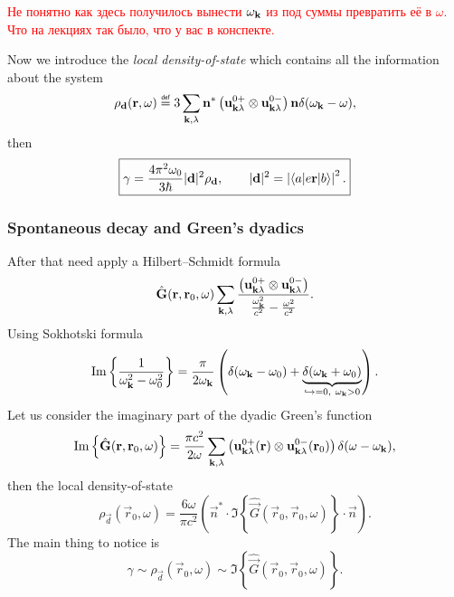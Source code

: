 \begin{otherlanguage}{russian}	
	\textcolor{red}{Не понятно как здесь получилось вынести $\omega_{\mathbf{k}}$ из под суммы превратить её в $\omega$. Что на лекциях так было, что у вас в конспекте.}
\end{otherlanguage}
Now we introduce the \textit{local density-of-state} which contains all the information about the system
\begin{equation}
	\rho_{\vec{d}} (\vec{r}, \omega) \myeq 3 \sum_{\kv, \lambda} \vec{n}^* \left( \vec{u}^{0+}_{\kv \lambda} \otimes \vec{u}^{0-}_{\kv \lambda} \right) \vec{n} \delta (\omega_{\kv} - \omega),
\end{equation}
then
\begin{equation}
	\boxed{	\gamma  = \frac{4 \pi^2 \omega_0}{3 \hbar} |\mathbf{d}|^2 \rho_{\mathbf{d}}, \qquad |\mathbf{d}|^2 = \left|  \langle a\rvert e \mathbf{r} \lvert b\rangle \right|^2. }
	\label{eq:gamma_start}
\end{equation}

\subsubsection{Spontaneous decay and Green's dyadics}

After that need apply a Hilbert–Schmidt formula 
\begin{equation}
	\hat{\mathbf{G}} (\mathbf{r}, \mathbf{r}_0, \omega) \sum_{\mathbf{k}, \lambda} \frac{\left( \mathbf{u}^{0+}_{\mathbf{k} \lambda} \otimes \mathbf{u}^{0-}_{\mathbf{k} \lambda} \right)}{\frac{\omega_{\mathbf{k}}^2}{c^2} - \frac{\omega^2}{c^2}}.
\end{equation}
Using Sokhotski formula
\begin{equation}
	\operatorname{Im} \left\{ \frac{1}{\omega_{\mathbf{k}}^2 - \omega_{0}^2} \right\} = \frac{\pi}{2 \omega_{\mathbf{k}}} \left( \delta(\omega_{\mathbf{k}} - \omega_{0}) + \underbrace{\delta(\omega_{\mathbf{k}} + \omega_{0})}_{\hookrightarrow=0,\ \omega_{\mathbf{k}}>0}\right).
\end{equation}
Let us consider the imaginary part of the dyadic Green's function
\begin{equation}
	\operatorname{Im} \left\{ \hat{\mathbf{G}}(\mathbf{r}, \mathbf{r}_0, \omega) \right\} = \frac{\pi c^2}{2 \omega} \sum_{\mathbf{k}, \lambda} \left( \mathbf{u}^{0+}_{\mathbf{k} \lambda} (\mathbf{r}) \otimes \mathbf{u}^{0-}_{\mathbf{k} \lambda} (\mathbf{r}_0) \right) \delta (\omega - \omega_{\mathbf{k}}),
\end{equation} 
then the local density-of-state
\begin{equation}
	\rho_{\vec{d}} (\vec{r}_0, \omega) = \frac{6 \omega}{\pi c^2} \left( \vec{n}^* \cdot \Im \left\{ \hat{\vec{G}} (\vec{r}_0, \vec{r}_0, \omega) \right\} \cdot \vec{n} \right).
\end{equation}
The main thing to notice is
\begin{equation}
	\boxed{	\gamma \sim \rho_{\vec{d}} (\vec{r}_0, \omega) \sim \Im \left\{ \hat{\vec{G}} (\vec{r}_0, \vec{r}_0, \omega) \right\}.}
\end{equation}

